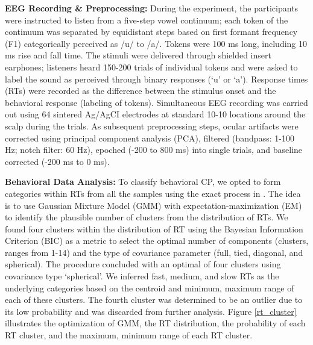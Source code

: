 \documentclass{article}
\begin{document}
\textbf{EEG Recording \& Preprocessing:} During the experiment, the participants were instructed to listen from a five-step vowel continuum; each token of the continuum was separated by equidistant steps based on first formant frequency (F1) categorically perceived as /u/ to /a/. Tokens were 100 ms long, including 10 ms rise and fall time. The stimuli were delivered through shielded insert earphones; listeners heard 150-200 trials of individual tokens and were asked to label the sound as perceived through binary responses (‘u’ or ‘a’). Response times (RTs) were recorded as the difference between the stimulus onset and the behavioral response (labeling of tokens). Simultaneous EEG recording was carried out using 64 sintered Ag/AgCI electrodes at standard 10-10 locations around the scalp during the trials. As subsequent preprocessing steps, ocular artifacts were corrected using principal component analysis (PCA), filtered (bandpass: 1-100 Hz; notch filter: 60 Hz), epoched (-200 to 800 ms) into single trials, and baseline corrected (-200 ms to 0 ms).

\textbf{Behavioral Data Analysis:} To classify behavioral CP, we opted to form categories within RTs from all the samples using the exact process in \cite{Al_Fahad_2020}. The idea is to use Gaussian Mixture Model (GMM) with expectation-maximization (EM) to identify the plausible number of clusters from the distribution of RTs. We found four clusters within the distribution of RT using the Bayesian Information Criterion (BIC) as a metric to select the optimal number of components (clusters, ranges from 1-14) and the type of covariance parameter (full, tied, diagonal, and spherical). The procedure concluded with an optimal of four clusters using covariance type ‘spherical’. We inferred fast, medium, and slow RTs as the underlying categories based on the centroid and minimum, maximum range of each of these clusters. The fourth cluster was determined to be an outlier due to its low probability and was discarded from further analysis. Figure \ref{rt_cluster} illustrates the optimization of GMM, the RT distribution, the probability of each RT cluster, and the maximum, minimum range of each RT cluster.
\end{document}
